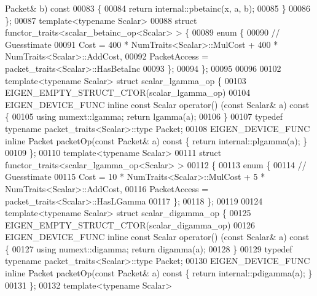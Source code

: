 \begin{DoxyCode}
      Packet& b)\textcolor{keyword}{ const}
00083 \textcolor{keyword}{  }\{
00084     \textcolor{keywordflow}{return} internal::pbetainc(x, a, b);
00085   \}
00086 \};
00087 \textcolor{keyword}{template}<\textcolor{keyword}{typename} Scalar>
00088 \textcolor{keyword}{struct }functor\_traits<scalar\_betainc\_op<Scalar> > \{
00089   \textcolor{keyword}{enum} \{
00090     \textcolor{comment}{// Guesstimate}
00091     Cost = 400 * NumTraits<Scalar>::MulCost + 400 * NumTraits<Scalar>::AddCost,
00092     PacketAccess = packet\_traits<Scalar>::HasBetaInc
00093   \};
00094 \};
00095 
00096 
00102 \textcolor{keyword}{template}<\textcolor{keyword}{typename} Scalar> \textcolor{keyword}{struct }scalar\_lgamma\_op \{
00103   EIGEN\_EMPTY\_STRUCT\_CTOR(scalar\_lgamma\_op)
00104   EIGEN\_DEVICE\_FUNC \textcolor{keyword}{inline} \textcolor{keyword}{const} Scalar operator() (\textcolor{keyword}{const} Scalar& a)\textcolor{keyword}{ const }\{
00105     \textcolor{keyword}{using} numext::lgamma; \textcolor{keywordflow}{return} lgamma(a);
00106   \}
00107   \textcolor{keyword}{typedef} \textcolor{keyword}{typename} packet\_traits<Scalar>::type Packet;
00108   EIGEN\_DEVICE\_FUNC \textcolor{keyword}{inline} Packet packetOp(\textcolor{keyword}{const} Packet& a)\textcolor{keyword}{ const }\{ \textcolor{keywordflow}{return} internal::plgamma(a); \}
00109 \};
00110 \textcolor{keyword}{template}<\textcolor{keyword}{typename} Scalar>
00111 \textcolor{keyword}{struct }functor\_traits<scalar\_lgamma\_op<Scalar> >
00112 \{
00113   \textcolor{keyword}{enum} \{
00114     \textcolor{comment}{// Guesstimate}
00115     Cost = 10 * NumTraits<Scalar>::MulCost + 5 * NumTraits<Scalar>::AddCost,
00116     PacketAccess = packet\_traits<Scalar>::HasLGamma
00117   \};
00118 \};
00119 
00124 \textcolor{keyword}{template}<\textcolor{keyword}{typename} Scalar> \textcolor{keyword}{struct }scalar\_digamma\_op \{
00125   EIGEN\_EMPTY\_STRUCT\_CTOR(scalar\_digamma\_op)
00126   EIGEN\_DEVICE\_FUNC \textcolor{keyword}{inline} \textcolor{keyword}{const} Scalar operator() (\textcolor{keyword}{const} Scalar& a)\textcolor{keyword}{ const }\{
00127     \textcolor{keyword}{using} numext::digamma; \textcolor{keywordflow}{return} digamma(a);
00128   \}
00129   \textcolor{keyword}{typedef} \textcolor{keyword}{typename} packet\_traits<Scalar>::type Packet;
00130   EIGEN\_DEVICE\_FUNC \textcolor{keyword}{inline} Packet packetOp(\textcolor{keyword}{const} Packet& a)\textcolor{keyword}{ const }\{ \textcolor{keywordflow}{return} internal::pdigamma(a); \}
00131 \};
00132 \textcolor{keyword}{template}<\textcolor{keyword}{typename} Scalar>

\end{DoxyCode}
